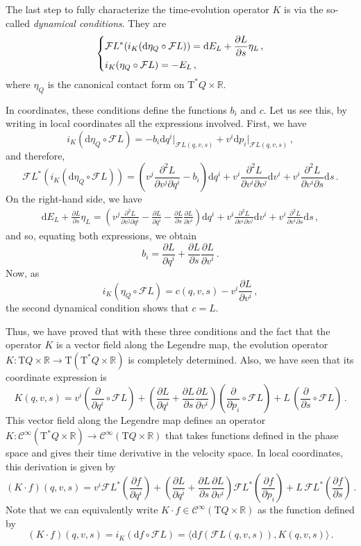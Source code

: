 \documentclass[11pt]{article}
\theoremstyle{plain}
\theoremstyle{definition}
\newcommand{\R}{\mathbb{R}}
\renewcommand{\d}{\mathrm{d}}
\newcommand{\Cinfty}{\mathscr{C}^\infty}
\newcommand{\T}{{\mathrm T}}
\let\Tan\T
\newcommand{\parder}[2]{\frac{\partial #1}{\partial #2}}
\newcommand{\parderr}[3]{\frac{\partial^2 #1}{\partial #2\partial #3}}
\def\d{\mathrm{d}}
\def\d{\mathrm{d}}
\def\Tan{\mathrm{T}}
\def\FL{\mathcal{F} L}
\begin{document}
The last step to fully characterize the time-evolution operator $K$ is via the so-called \textsl{dynamical conditions}. They are 
\begin{align}
\begin{dcases}
        \FL^*(i_K(\d \eta_Q \circ \FL)) = \d E_L + \parder{L}{s} \eta_L\,,
        \\
    i_K(\eta_Q\circ \FL) = -E_L\,,
\end{dcases}
\end{align}
where $\eta_Q$ is the canonical contact form on $\Tan^* Q \times \R$.

In coordinates, these conditions define the functions $b_i$ and $c$. Let us see this, by writing in local coordinates all the expressions involved. First, we have 
$$i_K(\d \eta_Q \circ \FL) = -b_i \d q^i\big|_{\FL(q,v,s)} + v^i \d p_i\big|_{\FL(q,v,s)} \,,$$
and therefore,
$$\FL^*(i_K(\d \eta_Q \circ \FL)) = 
\left( v^j \parderr{L}{v^j}{q^i} - b_i \right)\d q^i
+ v^i\parderr{L}{v^i}{v^j} \d v^i 
+v^i\parderr{L}{v^i}{s} \d s \,.
$$
On the right-hand side, we have 
\begin{align}
    \d E_L + \parder{L}{s} \eta_L = \left( v^j\parderr{L}{v^j}{q^i} - \parder{L}{q^i}- \parder{L}{s}\parder{L}{v^i} \right) \d q^i + v^i\parderr{L}{v^i}{v^j} \d v^i + v^i \parderr{L}{v^i}{s} \d s  \,,
\end{align}
$$$$
and so, equating both expressions, we obtain
\begin{equation}
    b_i = \parder{L}{q^i} + \parder{L}{s} \parder{L}{v^i} \,.
\end{equation}
Now, as
$$i_K(\eta_Q\circ\FL) = c(q,v,s)-v^i\parder{L}{v^i} \,,$$
the second dynamical condition
shows that $c = L$. 

Thus, we have proved that with these three conditions and the fact that the operator $K$ is a vector field along the Legendre map, the evolution operator $K\colon \Tan Q \times \R \to \Tan(\Tan^* Q \times \R)$ is completely determined. Also, we have seen that its coordinate expression is
\begin{equation}
    K(q,v,s) =
    v^i \left(\parder{}{q^i}\circ\FL\right) 
    +\left( \parder{L}{q^i} + \parder{L}{s} \parder{L}{v^i} \right) \left(\parder{}{p_i}\circ\FL\right) 
    + L \, \left(\parder{}{s}\circ\FL\right)\,.
\end{equation}
This vector field along the Legendre map defines an operator 
$K\colon \Cinfty (\Tan^*Q \times\R) \to \Cinfty(\Tan Q \times \R)$
that takes functions defined in the phase space and gives their time derivative in the velocity space. In local coordinates, this derivation is given by
\begin{equation}
        (K\cdot f)(q,v,s) =
    v^i \FL^*\left(\parder{f}{q^i}\right) 
    +\left( \parder{L}{q^i} + \parder{L}{s} \parder{L}{v^i} \right) \FL^*\left(\parder{f}{p_i}\right) 
    + L \, \FL^*\left(\parder{f}{s}\right)\,.
\end{equation}
Note that we can equivalently write $K\cdot f \in \Cinfty(\Tan Q \times \R)$ as the function defined by 
\begin{equation} \label{contact_K_derivation}
    (K\cdot f) (q,v,s) = i_K(\d f\circ \FL)= \langle \d f (\FL (q,v,s)), K(q,v,s) \rangle \,.
\end{equation}
\end{document}
